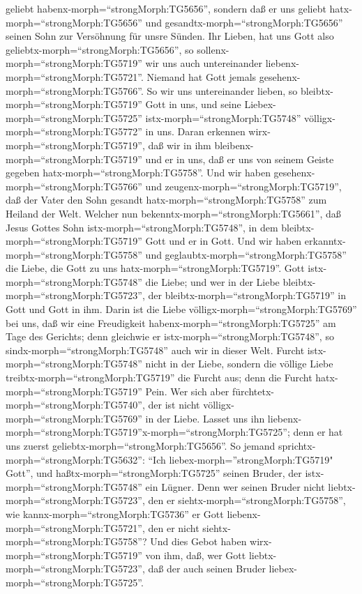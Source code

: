 geliebt habenx-morph=``strongMorph:TG5656'', sondern daß er uns geliebt
hatx-morph=``strongMorph:TG5656'' und
gesandtx-morph=``strongMorph:TG5656'' seinen Sohn zur Versöhnung für
unsre Sünden.  Ihr Lieben, hat uns Gott also
geliebtx-morph=``strongMorph:TG5656'', so
sollenx-morph=``strongMorph:TG5719'' wir uns auch untereinander
liebenx-morph=``strongMorph:TG5721''.  Niemand hat Gott
jemals gesehenx-morph=``strongMorph:TG5766''. So wir uns untereinander
lieben, so bleibtx-morph=``strongMorph:TG5719'' Gott in uns, und seine
Liebex-morph=``strongMorph:TG5725'' istx-morph=``strongMorph:TG5748''
völligx-morph=``strongMorph:TG5772'' in uns.  Daran
erkennen wirx-morph=``strongMorph:TG5719'', daß wir in ihm
bleibenx-morph=``strongMorph:TG5719'' und er in uns, daß er uns von
seinem Geiste gegeben hatx-morph=``strongMorph:TG5758''. 
Und wir haben gesehenx-morph=``strongMorph:TG5766'' und
zeugenx-morph=``strongMorph:TG5719'', daß der Vater den Sohn gesandt
hatx-morph=``strongMorph:TG5758'' zum Heiland der Welt. 
Welcher nun bekenntx-morph=``strongMorph:TG5661'', daß Jesus Gottes Sohn
istx-morph=``strongMorph:TG5748'', in dem
bleibtx-morph=``strongMorph:TG5719'' Gott und er in Gott. 
Und wir haben erkanntx-morph=``strongMorph:TG5758'' und
geglaubtx-morph=``strongMorph:TG5758'' die Liebe, die Gott zu uns
hatx-morph=``strongMorph:TG5719''. Gott
istx-morph=``strongMorph:TG5748'' die Liebe; und wer in der Liebe
bleibtx-morph=``strongMorph:TG5723'', der
bleibtx-morph=``strongMorph:TG5719'' in Gott und Gott in ihm.
 Darin ist die Liebe völligx-morph=``strongMorph:TG5769''
bei uns, daß wir eine Freudigkeit habenx-morph=``strongMorph:TG5725'' am
Tage des Gerichts; denn gleichwie er istx-morph=``strongMorph:TG5748'',
so sindx-morph=``strongMorph:TG5748'' auch wir in dieser Welt.
 Furcht istx-morph=``strongMorph:TG5748'' nicht in der
Liebe, sondern die völlige Liebe treibtx-morph=``strongMorph:TG5719''
die Furcht aus; denn die Furcht hatx-morph=``strongMorph:TG5719'' Pein.
Wer sich aber fürchtetx-morph=``strongMorph:TG5740'', der ist nicht
völligx-morph=``strongMorph:TG5769'' in der Liebe.  Lasset
uns ihn
liebenx-morph=``strongMorph:TG5719''\textbar x-morph=``strongMorph:TG5725'';
denn er hat uns zuerst geliebtx-morph=``strongMorph:TG5656''.
 So jemand sprichtx-morph=``strongMorph:TG5632'': ``Ich
liebex-morph=''strongMorph:TG5719" Gott'', und
haßtx-morph=``strongMorph:TG5725'' seinen Bruder, der
istx-morph=``strongMorph:TG5748'' ein Lügner. Denn wer seinen Bruder
nicht liebtx-morph=``strongMorph:TG5723'', den er
siehtx-morph=``strongMorph:TG5758'', wie
kannx-morph=``strongMorph:TG5736'' er Gott
liebenx-morph=``strongMorph:TG5721'', den er nicht
siehtx-morph=``strongMorph:TG5758''?  Und dies Gebot haben
wirx-morph=``strongMorph:TG5719'' von ihm, daß, wer Gott
liebtx-morph=``strongMorph:TG5723'', daß der auch seinen Bruder
liebex-morph=``strongMorph:TG5725''.

